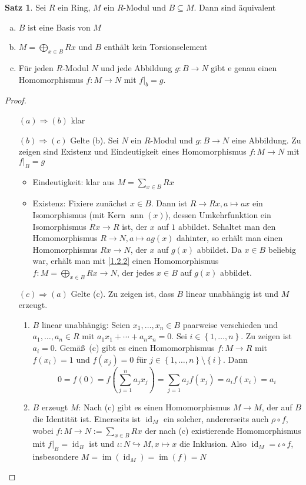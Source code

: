 \documentclass[
twoside=semi,
fontsize=12,
DIV=12, 
cleardoublepage=current,
leqno,
headings=optiontoheadandtoc, 
toc=idx
]{scrbook}
\newcommand{\brac}[1]{\left( #1 \right)}
\newcommand{\set}[1]{\left\{ #1 \right\}}
\DeclareMathOperator{\im}{im}
\DeclareMathOperator{\ann}{ann}
\DeclareMathOperator{\id}{id}
\theoremstyle{definition}
\newtheorem{satz}[definition]{Satz}
\begin{document}
	\begin{satz}\label{1.2.5}
		Sei $R$ ein Ring, $M$ ein $R$-Modul und $B \subseteq M$. Dann sind \"aquivalent
		\begin{enumerate}[(a)]
			\item $B$ ist eine Basis von $M$
			\item $M = \bigoplus_{x \in B} Rx$ und $B$ enth\"alt kein Torsionselement
			\item F\"ur jeden $R$-Modul $N$ und jede Abbildung $g:B \to N$ gibt e genau einen Homomorphismus $f:M \to N$ mit $f\big|_b = g$.
		\end{enumerate}
	
		\begin{proof}\hfill
			\begin{enumerate}
				\item[$(a) \Rightarrow (b)$] klar
				\item[$(b) \Rightarrow (c)$] Gelte (b). Sei $N$ ein $R$-Modul und $g:B \to N$ eine Abbildung. Zu zeigen sind Existenz und Eindeutigkeit eines Homomorphismus $f: M \to N$ mit $f\big|_B = g$
					\begin{itemize}
						\item Eindeutigkeit: klar aus $M = \sum_{x \in B} Rx$
						\item Existenz: Fixiere zun\"achst $x \in B$. Dann ist $R \to Rx, a \mapsto ax$ ein Isomorphismus (mit Kern $\ann(x)$), dessen Umkehrfunktion ein Isomorphismus $Rx \to R$ ist, der $x$ auf $1$ abbildet. Schaltet man den Homomorphismus $R \to N, a \mapsto ag(x)$ dahinter, so erh\"alt man einen Homomorphismus $Rx \to N$, der $x$ auf $g(x)$ abbildet. Da $x \in B$ beliebig war, erh\"alt man mit \ref{1.2.2} einen Homomorphismus $f: M = \bigoplus_{x \in B} Rx \to N$, der jedes $x \in B$ auf $g(x)$ abbildet.  
					\end{itemize}
				\item[$(c) \Rightarrow (a)$] Gelte (c). Zu zeigen ist, dass $B$ linear unabh\"angig ist und $M$ erzeugt.
				\begin{enumerate}[1.]
					\item $B$ linear unabh\"angig: Seien $x_1, \dots, x_n \in B$ paarweise verschieden und $a_1, \dots, a_n \in R$ mit $a_1x_1 + \cdots + a_nx_n = 0$. Sei $i \in \set{1, \dots, n}$. Zu zeigen ist $a_i = 0$. Gem\"a\ss\ (c) gibt es einen Homomorphismus $f: M \to R$ mit $f(x_i) = 1$ und $f(x_j) = 0$ f\"ur $j \in \set{1, \dots, n} \setminus \set{i}$.
					Dann \[0 = f(0) = f\brac{\sum_{j=1}^n a_jx_j} = \sum_{j=1}a_jf(x_j) = a_if(x_i) = a_i\]
					
					\item $B$ erzeugt $M$: Nach (c) gibt es einen Homomorphismus $M \to M$, der auf $B$ die Identit\"at ist. Einerseits ist $\id_M$ ein solcher, andererseits auch $\rho \circ f$, wobei $f: M \to N:= \sum_{x \in B} Rx$ der nach (c) existierende Homomorphismus mit $f\big|_{B} = \id_B$ ist und $\iota: N \hookrightarrow M, x \mapsto x$ die Inklusion. Also $\id_M = \iota \circ f$, insbesondere $M = \im(\id_M) = \im(f) = N$
				\end{enumerate}
 			\end{enumerate}
		\end{proof}
	\end{satz}
\end{document}
